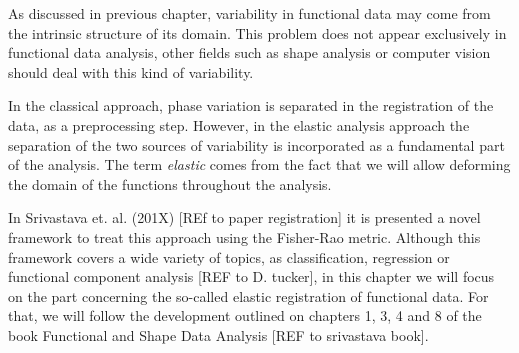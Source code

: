 As discussed in previous chapter, variability in functional data may come
from the intrinsic structure of its domain. This problem does not appear
exclusively in functional data analysis, other fields such as shape analysis or
computer vision should deal with this kind of variability.

In the classical approach, phase variation is separated in the registration of
the data, as a preprocessing step. However, in the elastic analysis approach the
separation of the two sources of variability is incorporated as a fundamental
part of the analysis. The term \textit{elastic} comes from the fact that we will allow
deforming the domain of the functions throughout the analysis.

In Srivastava et. al. (201X) [REf to paper registration] it is presented a novel
framework to treat this approach using the Fisher-Rao metric. Although this
framework covers a wide variety of topics, as classification, regression or
functional component analysis [REF to D. tucker], in this chapter we will focus
on the part concerning the so-called elastic registration of functional data.
For that, we will follow the development outlined on chapters 1, 3, 4 and 8 of 
the book Functional and Shape Data Analysis [REF to srivastava book].
